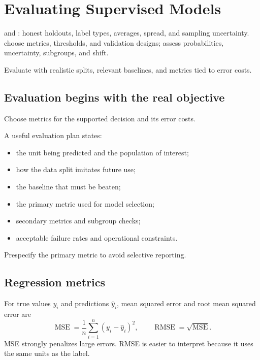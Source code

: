 \chapter{Evaluating Supervised Models}
\label{ch:evaluation}

\chapterguide%
  { and : honest holdouts, label types, averages, spread, and sampling uncertainty.}
  {choose metrics, thresholds, and validation designs; assess probabilities, uncertainty, subgroups, and shift.}

Evaluate with realistic splits, relevant baselines, and metrics tied to error costs.

\section{Evaluation begins with the real objective}

Choose metrics for the supported decision and its error costs.

A useful evaluation plan states:

\begin{itemize}
  \item the unit being predicted and the population of interest;
  \item how the data split imitates future use;
  \item the baseline that must be beaten;
  \item the primary metric used for model selection;
  \item secondary metrics and subgroup checks;
  \item acceptable failure rates and operational constraints.
\end{itemize}

Prespecify the primary metric to avoid selective reporting.

\section{Regression metrics}
\label{sec:regression-metrics}

For true values $y_i$ and predictions $\hat{y}_i$, mean squared error and root mean squared error are
\[
  \operatorname{MSE}
  =\frac{1}{n}\sum_{i=1}^{n}{(y_i-\hat{y}_i)}^2,
  \qquad
  \operatorname{RMSE}=\sqrt{\operatorname{MSE}}.
\]
MSE strongly penalizes large errors. RMSE is easier to interpret because it uses the same units as the label.

